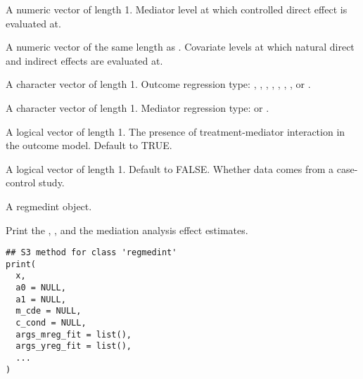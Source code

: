 \documentclass[a4paper]{book}
\begin{document}
\begin{Arguments}
\begin{ldescription}
\item[\code{m\_cde}] A numeric vector of length 1. Mediator level at which controlled direct effect is evaluated at.

\item[\code{c\_cond}] A numeric vector of the same length as . Covariate levels at which natural direct and indirect effects are evaluated at.

\item[\code{yreg}] A character vector of length 1. Outcome regression type: , , , , , , , or .

\item[\code{mreg}] A character vector of length 1. Mediator regression type:  or .

\item[\code{interaction}] A logical vector of length 1. The presence of treatment-mediator interaction in the outcome model. Default to TRUE.

\item[\code{casecontrol}] A logical vector of length 1. Default to FALSE. Whether data comes from a case-control study.
\end{ldescription}
\end{Arguments}
%
\begin{Value}
A regmedint object.
\end{Value}
%
\begin{Description}
Print the , , and the mediation analysis effect estimates.
\end{Description}
%
\begin{Usage}
\begin{verbatim}
## S3 method for class 'regmedint'
print(
  x,
  a0 = NULL,
  a1 = NULL,
  m_cde = NULL,
  c_cond = NULL,
  args_mreg_fit = list(),
  args_yreg_fit = list(),
  ...
)
\end{verbatim}
\end{Usage}
%
\end{document}
